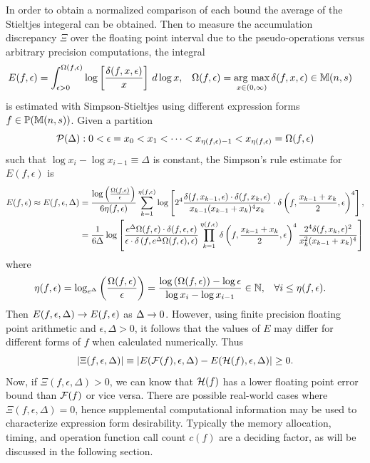 \documentclass[]{elsarticle}
\begin{document}
In order to obtain a normalized comparison of each bound the average of the Stieltjes integeral can be obtained.
Then to measure the accumulation discrepancy $\Xi$ over the floating point interval due to the pseudo-operations versus arbitrary precision computations, the integral
\begin{align*}
	E(f,\epsilon) &= \int_{\epsilon>0}^{\Omega(f,\epsilon)} \log\left[\frac{\delta(f,x,\epsilon)}{x}\right]\,d\log x,
				  & \Omega(f,\epsilon) &= \underset{x\in(0,\infty)}{\text{arg max}}\, \delta(f,x,\epsilon)\in\mathbb{M}(n,s) 
\end{align*}
is estimated with Simpson-Stieltjes \cite{rudin} using different expression forms $f\in\mathbb{P}(\mathbb{M}(n,s))$.
Given a partition $$\mathcal{P}(\Delta):0<\epsilon = x_0 < x_1 < \dots < x_{\eta(f,\epsilon)-1} < x_{\eta(f,\epsilon)} = \Omega(f,\epsilon)$$ such that $\log x_i-\log x_{i-1} \equiv \Delta$ is constant, the Simpson's rule \cite{tveito} estimate for $E(f,\epsilon)$ is
\begin{align*}
	E(f,\epsilon) \approx E(f,\epsilon,\Delta) 
	&= \frac{\log\left(\frac{\Omega(f,\epsilon)}{\epsilon}\right)}{6\eta(f,\epsilon)}\sum_{k=1}^{\eta(f,\epsilon)} \log\left[2^4\frac{\delta(f,x_{k-1},\epsilon)\cdot\delta(f,x_k,\epsilon)}{x_{k-1}(x_{k-1}+x_k)^4x_k} \cdot\delta\left(f,\frac{x_{k-1}+x_k}2,\epsilon\right)^4 \right], \\
	&= \frac1{6\Delta}\log\left[ \frac{e^\Delta\Omega(f,\epsilon)\cdot\delta(f,\epsilon,\epsilon)}{\epsilon\cdot\delta\left(f,e^\Delta\Omega(f,\epsilon),\epsilon\right) } \prod_{k=1}^{\eta(f,\epsilon)} \delta\left(f,\frac{x_{k-1}+x_k}2,\epsilon\right)^4 \frac{2^4\delta(f,x_k,\epsilon)^2}{x_k^2(x_{k-1}+x_k)^4} \right]
\end{align*}
where
\begin{align*}
	\eta(f,\epsilon) &= \log_{e^\Delta}\left(\frac{\Omega(f,\epsilon)}\epsilon\right) = \frac{\log\left(\Omega(f,\epsilon)\right)-\log\epsilon}{\log x_i-\log x_{i-1}}\in\mathbb{N}, & & \forall i \leq \eta(f,\epsilon).
\end{align*}
Then $E(f,\epsilon,\Delta)\rightarrow E(f,\epsilon)$ as $\Delta\rightarrow0$. However, using finite precision floating point arithmetic and $\epsilon,\Delta>0$, it follows that the values of $E$ may differ for different forms of $f$ when calculated numerically. Thus
$$ |\Xi(f,\epsilon,\Delta)| \equiv \left|E(\mathcal{F}(f),\epsilon,\Delta) - E(\mathcal{H}(f),\epsilon, \Delta)\right| \geq 0. $$
Now, if $\Xi(f,\epsilon,\Delta)>0$, we can know that $\mathcal{H}(f)$ has a lower floating point error bound than $\mathcal{F}(f)$ or vice versa. 
There are possible real-world cases where $\Xi(f,\epsilon,\Delta)=0$, hence supplemental computational information may be used to characterize expression form desirability.
Typically the memory allocation, timing, and operation function call count $c(f)$ are a deciding factor, as will be discussed in the following section.
\end{document}
